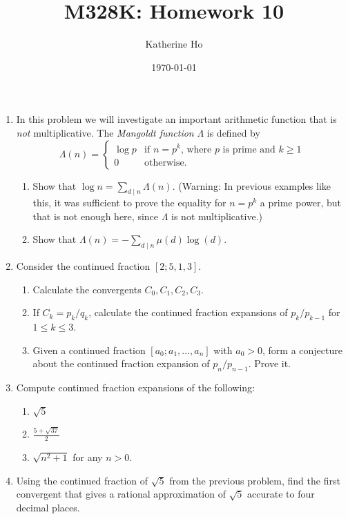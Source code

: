 \documentclass[11pt]{article}
\title{M328K: Homework 10}
\author{Katherine Ho}
\date\today
\theoremstyle{definition}
\begin{document}
\maketitle

\begin{enumerate}
    \item In this problem we will investigate an important arithmetic function that is \emph{not} multiplicative. The \emph{Mangoldt function} $\Lambda$ is defined by
$$
\Lambda(n) = \begin{cases}
    \log p & \text{if $n=p^k$, where $p$ is prime and $k\geq 1$} \\
    0 & \text{otherwise.}
\end{cases}
$$
\begin{enumerate}
    \item Show that $\log n = \sum_{d\mid n} \Lambda(n)$. (Warning: In previous examples like this, it was sufficient to prove the equality for $n=p^k$ a prime power, but that is not enough here, since $\Lambda$ is not multiplicative.)
    \item Show that $\Lambda(n) = -\sum_{d\mid n} \mu(d)\log(d)$.
\end{enumerate}


    \item Consider the continued fraction $[2;5,1,3]$.
    \begin{enumerate}
        \item Calculate the convergents $C_0, C_1, C_2, C_3$.
        \item If $C_k = p_k/q_k$, calculate the continued fraction expansions of $p_k/p_{k-1}$ for $1\leq k\leq 3$.
        \item Given a continued fraction $[a_0;a_1,\dots,a_n]$ with $a_0>0$, form a conjecture about the continued fraction expansion of $p_n/p_{n-1}$. Prove it.
    \end{enumerate}
    \item Compute continued fraction expansions of the following:
    \begin{enumerate}
        \item $\sqrt 5$
        \item $\displaystyle\frac{5+\sqrt{37}}{2}$
        \item $\sqrt{n^2+1}$ for any $n>0$.
    \end{enumerate}
    \item Using the continued fraction of $\sqrt 5$ from the previous problem, find the first convergent that gives a rational approximation of $\sqrt 5$ accurate to four decimal places.
\end{enumerate}
\end{document}
